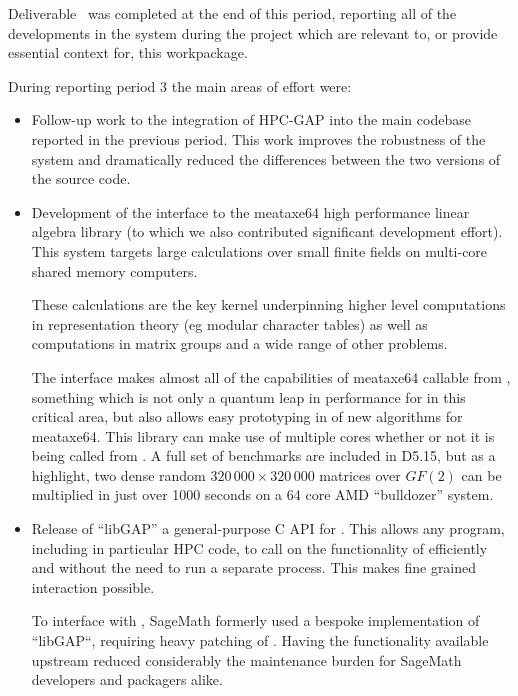 Deliverable~ was completed at the end of this period,
reporting all of the developments in the \GAP system during the project which are relevant
to, or provide essential context for, this workpackage.

During reporting period 3 the main areas of effort were:
\begin{itemize}
\item Follow-up work to the integration of HPC-GAP into the main codebase reported in
  the previous period. This work improves the robustness of the system and dramatically reduced the
  differences between the two versions of the source code.
\item
  \ednote
  Development of the \GAP interface to the meataxe64 high performance linear algebra library (to which
  we also contributed significant development effort). This system targets large calculations over
  small finite fields on multi-core shared memory computers.

  These calculations are the key kernel underpinning higher level
  computations in representation theory (eg modular character tables)
  as well as computations in matrix groups and a wide range of other problems.
  
  The interface makes almost all of the
  capabilities of meataxe64 callable from \GAP, something which is not only a quantum leap in
  performance for \GAP in this critical area, but also allows easy prototyping in \GAP of new
  algorithms for meataxe64.  This library can make use of multiple cores whether or not it is being
  called from \HPCGAP. A full set of benchmarks are included in D5.15, but as a highlight, two
  dense random $320\,000\times 320\,000$ matrices over $GF(2)$ can be multiplied in just over 1000
  seconds on a 64 core AMD ``bulldozer'' system.
  \item Release of ``libGAP'' a general-purpose C API for \GAP. This allows any program, including in particular HPC code, to call on the
    functionality of \GAP efficiently and without the need to run a separate \GAP process. This makes
    fine grained interaction possible.

    To interface with \GAP, SageMath formerly used a bespoke
    implementation of ``libGAP``, requiring heavy patching of \GAP.
    Having the functionality available upstream reduced considerably
    the maintenance burden for SageMath developers and packagers
    alike.


\end{itemize}
